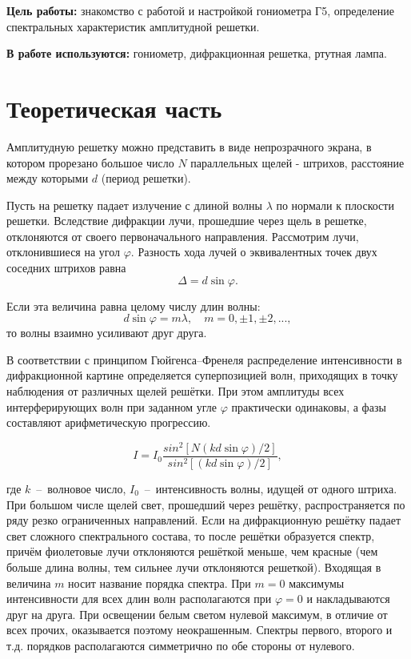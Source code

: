 \documentclass{letask}
\begin{document}


\textbf{Цель работы:} знакомство с работой и настройкой гониометра Г5, определение спектральных характеристик амплитудной решетки.

\textbf{В работе используются:} гониометр, дифракционная решетка, ртутная лампа.

\section{Теоретическая часть}

Амплитудную решетку можно представить в виде непрозрачного экрана, в котором прорезано большое число $N$ параллельных щелей - штрихов, расстояние между которыми $d$ (период решетки).


Пусть на решетку падает излучение с длиной волны $\lambda$ по нормали к плоскости решетки. Вследствие дифракции лучи, прошедшие через щель в решетке, отклоняются от своего первоначального направления. Рассмотрим лучи, отклонившиеся на угол $\varphi$. Разность хода лучей о эквивалентных точек двух соседних штрихов равна 
\[ \Delta = d \sin \varphi .\]

Если эта величина равна целому числу длин волны:
\[ d \sin \varphi = m \lambda, \quad m = 0, \pm 1, \pm 2, ... ,\]
то волны взаимно усиливают друг друга.


В соответствии с принципом Гюйгенса–Френеля распределение интенсивности в дифракционной картине определяется суперпозицией волн, приходящих в точку наблюдения от различных щелей решётки. При этом амплитуды всех интерферирующих волн при заданном угле $\varphi$ практически одинаковы, а фазы составляют арифметическую прогрессию.


\[
I = I_0 \dfrac{sin^2[N(kd \sin{\varphi})/2]}{sin^2[(kd \sin{\varphi})/2]},
\]

где $k$~--~волновое число, $I_0$~--~интенсивность волны, идущей от одного штриха. При большом числе щелей свет, прошедший через решётку, распространяется по ряду резко ограниченных направлений. Если на дифракционную решётку падает свет сложного спектрального состава, то после решётки образуется спектр, причём фиолетовые лучи отклоняются решёткой меньше, чем красные (чем больше длина волны, тем сильнее лучи отклоняются решеткой). Входящая в величина $m$ носит название порядка спектра. При $m = 0$ максимумы интенсивности для всех длин волн располагаются при $\varphi = 0$ и накладываются друг на друга. При освещении белым светом нулевой максимум, в отличие от всех прочих, оказывается поэтому неокрашенным. Спектры первого, второго и т.д. порядков располагаются симметрично по обе стороны от нулевого.
\end{document}
